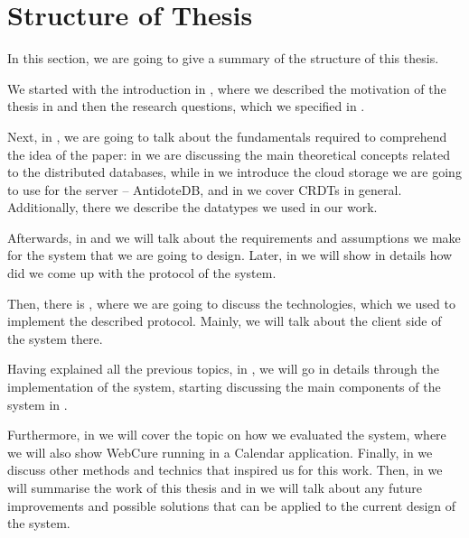 \section{Structure of Thesis}

In this section, we are going to give a summary of the structure of this thesis. 

We started with the introduction in , where we described the motivation of the thesis in  and then the research questions, which we specified in . 

Next, in , we are going to talk about the fundamentals required to comprehend the idea of the paper: in  we are discussing the main theoretical concepts related to the distributed databases, while in  we introduce the cloud storage we are going to use for the server -- AntidoteDB, and in  we cover CRDTs in general. Additionally, there we describe the datatypes we used in our work. 

Afterwards, in  and  we will talk about the requirements and assumptions we make for the system that we are going to design. Later, in  we will show in details how did we come up with the protocol of the system. 

Then, there is , where we are going to discuss the technologies, which we used to implement the described protocol. Mainly, we will talk about the client side of the system there.

Having explained all the previous topics, in , we will go in details through the implementation of the system, starting discussing the main components of the system in .

Furthermore, in  we will cover the topic on how we evaluated the system, where we will also show WebCure running in a Calendar application. Finally, in  we discuss other methods and technics that inspired us for this work. Then, in  we will summarise the work of this thesis and in  we will talk about any future improvements and possible solutions that can be applied to the current design of the system. 
